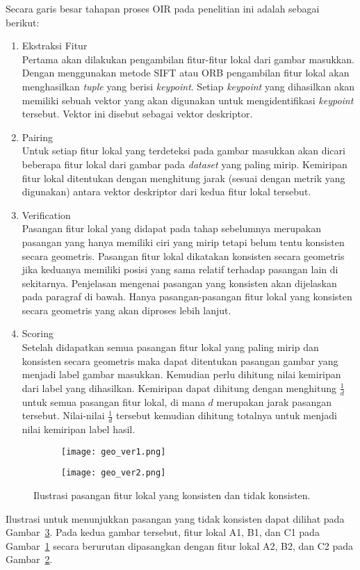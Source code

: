 Secara garis besar tahapan proses OIR pada penelitian ini adalah sebagai berikut:
\begin{enumerate}
	\item Ekstraksi Fitur \\
	Pertama akan dilakukan pengambilan fitur-fitur lokal dari gambar masukkan. Dengan menggunakan metode SIFT atau ORB pengambilan fitur lokal akan menghasilkan \textit{tuple} yang  berisi \textit{keypoint}. Setiap \textit{keypoint} yang dihasilkan akan memiliki sebuah vektor yang akan digunakan untuk mengidentifikasi \textit{keypoint} tersebut. Vektor ini disebut sebagai vektor deskriptor.
	\item Pairing \\
	Untuk setiap fitur lokal yang terdeteksi pada gambar masukkan akan dicari beberapa fitur lokal dari gambar pada \textit{dataset} yang paling mirip. Kemiripan fitur lokal ditentukan dengan menghitung jarak (sesuai dengan metrik yang digunakan) antara vektor deskriptor dari kedua fitur lokal tersebut.
	\item Verification \\
	Pasangan fitur lokal yang didapat pada tahap sebelumnya merupakan pasangan yang hanya memiliki ciri yang mirip tetapi belum tentu konsisten secara geometris. Pasangan fitur lokal dikatakan konsisten secara geometris jika keduanya memiliki posisi yang sama relatif terhadap pasangan lain di sekitarnya. Penjelasan mengenai pasangan yang konsisten akan dijelaskan pada paragraf di bawah. Hanya pasangan-pasangan fitur lokal yang konsisten secara geometris yang akan diproses lebih lanjut.
	\item Scoring \\
	Setelah didapatkan semua pasangan fitur lokal yang paling mirip dan konsisten secara geometris maka dapat ditentukan pasangan gambar yang menjadi label gambar masukkan. Kemudian perlu dihitung nilai kemiripan dari label yang dihasilkan. Kemiripan dapat dihitung dengan menghitung $\frac{1}{d}$ untuk semua pasangan fitur lokal, di mana $d$ merupakan jarak pasangan tersebut. Nilai-nilai $\frac{1}{d}$ tersebut kemudian dihitung totalnya untuk menjadi nilai kemiripan label hasil.
\end{enumerate}
\begin{figure}[H]
	\begin{subfigure}[b]{.5\textwidth}
		\centering
		\texttt{[image: geo\_ver1.png]}
		\caption{}
		\label{subfig:geo_ver1}
	\end{subfigure}%
	\begin{subfigure}[b]{.5\textwidth}
		\centering
		\texttt{[image: geo\_ver2.png]}
		\caption{}
		\label{subfig:geo_ver2}
	\end{subfigure}
	\caption{Ilustrasi pasangan fitur lokal yang konsisten dan tidak konsisten.}
	\label{fig:geo_ver}
\end{figure}
Ilustrasi untuk menunjukkan pasangan yang tidak konsisten dapat dilihat pada Gambar~\ref{fig:geo_ver}. Pada kedua gambar tersebut, fitur lokal A1, B1, dan C1 pada Gambar~\ref{subfig:geo_ver1} secara berurutan dipasangkan dengan fitur lokal A2, B2, dan C2 pada Gambar~\ref{subfig:geo_ver2}. 

